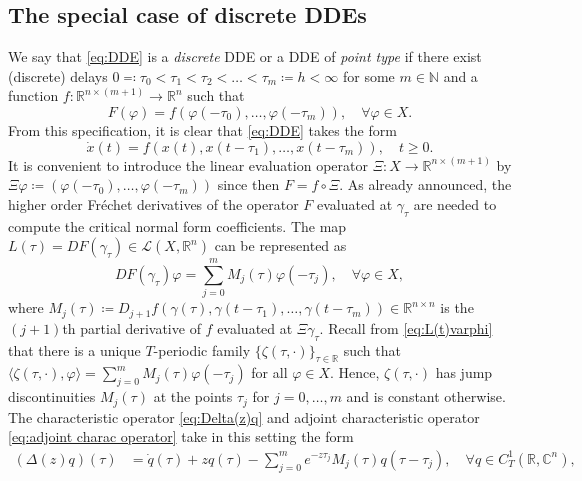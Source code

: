 \documentclass[english]{myarticle}
\begin{document}
\begin{sloppypar}
\subsection{The special case of discrete DDEs} \label{subsec: discrete DDEs}
We say that \eqref{eq:DDE} is a \emph{discrete} DDE or a DDE of \emph{point type} if there exist (discrete) delays $0 \eqqcolon \tau_0 < \tau_1 < \tau_2 < \dots < \tau_m \coloneqq h < \infty$ for some $m \in \mathbb{N}$ and a function $f : \mathbb{R}^{n \times (m+1)} \to \mathbb{R}^n$ such that
\begin{equation*}
    F(\varphi) = f(\varphi(-\tau_0),\dots,\varphi(-\tau_m)), \quad \forall \varphi \in X.
\end{equation*}
From this specification, it is clear that \eqref{eq:DDE} takes the form
\begin{equation} \label{eq: discrete DDE}
    \dot{x}(t) = f(x(t),x(t-\tau_1),\dots,x(t-\tau_m)), \quad t \geq 0.
\end{equation}
It is convenient to introduce the linear evaluation operator $\Xi : X \to \mathbb{R}^{n \times (m+1)}$ by $\Xi \varphi \coloneqq (\varphi(-\tau_0),\dots,\varphi(-\tau_m))$ since then $F = f \circ \Xi$. As already announced, the higher order Fr\'echet derivatives of the operator $F$ evaluated at  $\gamma_\tau$ are needed to compute the critical normal form coefficients. The map $L(\tau) = DF(\gamma_\tau) \in \mathcal{L}(X,\mathbb{R}^n)$ can be represented as
\begin{equation} \label{eq:derivative}
    DF(\gamma_\tau)\varphi = \sum_{j=0}^{m} M_j(\tau) \varphi(-\tau_j), \quad \forall \varphi \in X,
\end{equation}
where $M_j(\tau) \coloneqq D_{j+1} f(\gamma(\tau),\gamma(t-\tau_1),\dots,\gamma(t-\tau_m)) \in \mathbb{R}^{n \times n}$ is the $(j+1)$th partial derivative of $f$ evaluated at $\Xi \gamma_\tau$. Recall from \eqref{eq:L(t)varphi} that there is a unique $T$-periodic family $\{\zeta(\tau,\cdot)\}_{\tau \in \mathbb{R}}$ such that $\langle \zeta(\tau,\cdot), \varphi \rangle = \sum_{j=0}^{m} M_j(\tau) \varphi(-\tau_j)$ for all $\varphi \in X$. Hence, $\zeta(\tau,\cdot)$ has jump discontinuities $M_j(\tau)$ at the points $\tau_j$ for $j = 0,\dots,m$ and is constant otherwise. The characteristic operator \eqref{eq:Delta(z)q} and adjoint characteristic operator \eqref{eq:adjoint charac operator} take in this setting the form
\begin{align*}
    (\Delta(z)q)(\tau) &= \dot{q}(\tau) + z q(\tau) - \sum_{j=0}^m e^{-z \tau_j} M_j(\tau)  q(\tau - \tau_j), \quad \forall q \in C_T^1(\mathbb{R},\mathbb{C}^{n}), \\

\end{align*}
\end{sloppypar}
\end{document}
